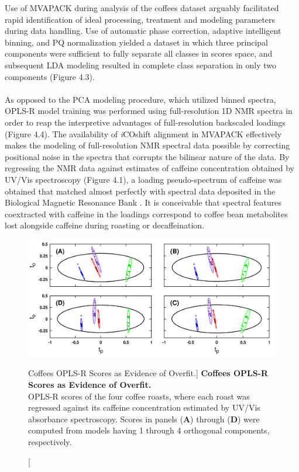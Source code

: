 \begin{doublespace}
Use of MVAPACK during analysis of the coffees dataset arguably facilitated
rapid identification of ideal processing, treatment and modeling parameters
during data handling. Use of automatic phase correction, adaptive intelligent
binning, and PQ normalization yielded a dataset in which three principal
components were sufficient to fully separate all classes in scores space,
and subsequent LDA modeling resulted in complete class separation in only
two components (Figure 4.3).
\\\\
As opposed to the PCA modeling procedure, which utilized binned spectra,
OPLS-R model training was performed using full-resolution 1D \hnmr{} NMR
spectra in order to reap the interpretive advantages of full-resolution
backscaled loadings (Figure 4.4). The availability of \emph{i}COshift
alignment \cite{savorani:jmr2010} in MVAPACK effectively makes the modeling
of full-resolution NMR spectral data possible by correcting positional noise
\cite{aberg:abc2009} in the spectra that corrupts the bilinear nature of the
data. By regressing the NMR data against estimates of caffeine concentration
obtained by UV/Vis spectroscopy (Figure 4.1), a loading pseudo-spectrum of
caffeine was obtained that matched almost perfectly with spectral data
deposited in the Biological Magnetic Resonance Bank \cite{ulrich:nar2008}.
It is conceivable that spectral features coextracted with caffeine in the
loadings correspond to coffee bean metabolites lost alongside caffeine during
roasting or decaffeination.
\end{doublespace}

\begin{figure}[H]
\includegraphics[width=6.5in]{figs/apps/05-oplsr-t.png}
\caption
      [Coffees OPLS-R Scores as Evidence of Overfit.]{
  {\bf Coffees OPLS-R Scores as Evidence of Overfit.}
  \\
  OPLS-R scores of the four coffee roasts, where each roast was regressed
  against its caffeine concentration estimated by UV/Vis absorbance
  spectroscopy. Scores in panels ({\bf A}) through ({\bf D}) were computed
  from models having 1 through 4 orthogonal components, respectively.
}
\end{figure}

